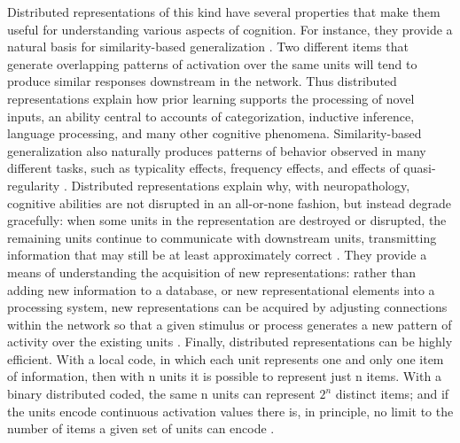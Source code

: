 Distributed representations of this kind have several properties that make them useful for understanding various aspects of cognition. For instance, they provide a natural basis for similarity-based generalization \cite{hinton_distributed_1984,RumelhartTodd93}. Two different items that generate overlapping patterns of activation over the same units will tend to produce similar responses downstream in the network. Thus distributed representations explain how prior learning supports the processing of novel inputs, an ability central to accounts of categorization, inductive inference, language processing, and many other cognitive phenomena. Similarity-based generalization also naturally produces patterns of behavior observed in many different tasks, such as typicality effects, frequency effects, and effects of quasi-regularity \cite{plaut_understanding_1996,rogers_semantic_2004}. Distributed representations explain why, with neuropathology, cognitive abilities are not disrupted in an all-or-none fashion, but instead degrade gracefully: when some units in the representation are destroyed or disrupted, the remaining units continue to communicate with downstream units, transmitting information that may still be at least approximately correct \cite{Allport85,cooper_shallice_2011}. They provide a means of understanding the acquisition of new representations: rather than adding new information to a database, or new representational elements into a processing system, new representations can be acquired by adjusting connections within the network so that a given stimulus or process generates a new pattern of activity over the existing units \cite{RumelhartTodd93}. Finally, distributed representations can be highly efficient. With a local code, in which each unit represents one and only one item of information, then with n units it is possible to represent just n items. With a binary distributed coded, the same n units can represent $2^n$ distinct items; and if the units encode continuous activation values there is, in principle, no limit to the number of items a given set of units can encode \cite{hinton_distributed_1984}.

